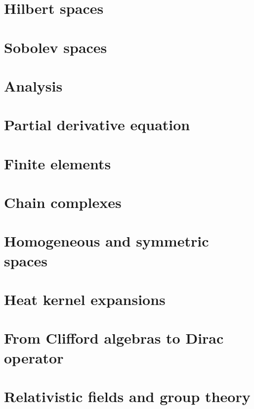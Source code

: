 \documentclass[a4paper,twoside,11pt]{book}
\begin{document}
\chapter{Hilbert spaces}



\chapter{Sobolev spaces}


\chapter{Analysis}




\chapter{Partial derivative equation}


\chapter{Finite elements}


\chapter{Chain complexes}


\chapter{Homogeneous and symmetric spaces}




\chapter{Heat kernel expansions}


\chapter{From Clifford algebras to Dirac operator}



\chapter{Relativistic fields and group theory}

\end{document}
